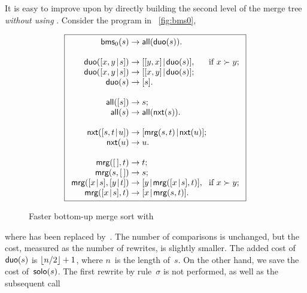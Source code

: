 It is easy to improve upon  by directly building the second
level of the merge tree \emph{without using
  }. Consider the program in
\fig~\vref{fig:bms0},
\begin{figure}
\begin{equation*}
\boxed{%
\begin{array}{r@{\;}l@{\;}l@{\;}l}
\fun{bms}_0(s)   & \rightarrow & \fun{all}(\fun{duo}(s)).\\
\\
\fun{duo}(\cons{x,y}{s}) & \rightarrow & \cons{[y,x]}{\fun{duo}(s)},
                                       & \text{if \(x \succ y\)};\\
\fun{duo}(\cons{x,y}{s}) & \rightarrow & \cons{[x,y]}{\fun{duo}(s)};\\
\fun{duo}(s)             & \rightarrow & [s].\\
\\
\fun{all}([s]) & \rightarrow & s;\\
\fun{all}(s)   & \rightarrow & \fun{all}(\fun{nxt}(s)).\\
\\
\fun{nxt}(\cons{s,t}{u}) & \rightarrow
                         & \cons{\fun{mrg}(s,t)}{\fun{nxt}(u)};\\
\fun{nxt}(u)             & \rightarrow & u.\\
\\
\fun{mrg}(\el,t)         & \rightarrow & t;\\
\fun{mrg}(s,\el)         & \rightarrow & s;\\
\fun{mrg}(\cons{x}{s},\cons{y}{t}) & \rightarrow
                         & \cons{y}{\fun{mrg}(\cons{x}{s},t)},
                         & \text{if \(x \succ y\)};\\
\fun{mrg}(\cons{x}{s},t) & \rightarrow & \cons{x}{\fun{mrg}(s,t)}.
\end{array}}
\end{equation*}
\caption{Faster bottom\hyp{}up merge sort with }
\label{fig:bms0}
\end{figure}
where  has been replaced
by~. The number of comparisons is
unchanged, but the cost, measured as the number of rewrites, is
slightly smaller. The added cost
of~\(\textsf{duo}(s)\) is \(\lfloor{n/2}\rfloor+1\), where
\(n\)~is the length of~\(s\). On the other hand, we save the cost
of~\(\textsf{solo}(s)\). The first rewrite by
rule~\(\sigma\) is not performed, as well as the subsequent call
